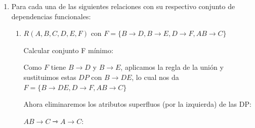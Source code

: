 \documentclass{article}
\begin{document}
\begin{enumerate}
\begin{enumerate}
\begin{itemize}
\begin{itemize}
                $\{E \}+= \{EC\} \times$
                
                $\{D \}+=\{DB\} \times $(Llave por R = ABE)
                
                \textbf{S(A,B,C,D)} con $\{AB \rightarrow CD\,D \rightarrow B \}$
                
                $\{AB\}+=\{ABCD\}$ por lo tanto AB = llave
                
                $\{D \}+={DB} \times$
                
                $u=(D,B)$ con $D\rightarrow B$ por lo tanto D = llave, cumple. 
                
                $V(D,A,C)$ con $DAC \rightarrow DAC$ por lo tanto $DAC = llave$ tambien cumple.
                
                DF es perdida \{$E \rightarrow C$ y $AB \rightarrow CD$ \}(Join con perdida)
                
                Por lo tanto BCNF no sirve y esto es 3NF
                
                \textbf{T(A,B,E)} con $ABE \rightarrow ABE$ por lo tanto $ABE = llave$
                
              
            \end{itemize}
            
            
        \end{itemize}
        
    \end{enumerate}
    
    \item Para cada una de las siguientes relaciones con su respectivo conjunto de dependencias funcionales:
    \begin{enumerate}
        \item $R (A, B, C, D, E, F)$ con $F = \{ B \rightarrow D, B \rightarrow E, D \rightarrow F, AB \rightarrow C \}$
        
        Calcular conjunto F mínimo:
        
        Como $F$ tiene $B \rightarrow D$ y $B \rightarrow E$, aplicamos la regla de la unión y sustituimos estas $DP$ con $B \rightarrow DE$, lo cual nos da $F = \{ B \rightarrow DE, D \rightarrow F, AB \rightarrow C \}$
        
        Ahora eliminaremos los atributos superfluos (por la izquierda) de las DP:
        
        $AB \rightarrow C \rightarrowtriangle A \rightarrow C:$
        

\end{enumerate}
\end{enumerate}
\end{document}
